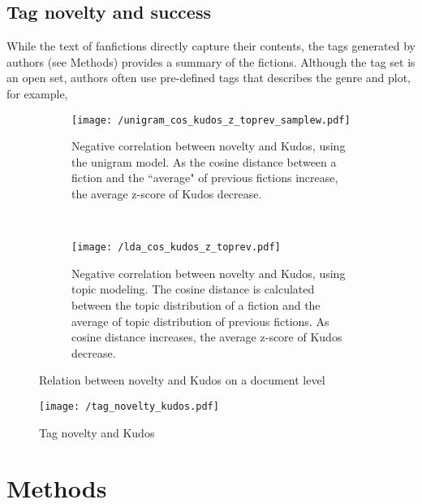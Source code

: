\documentclass[a4paper]{article}
\begin{document}
\subsection{Tag novelty and success}
While the text of fanfictions directly capture their contents, the tags generated by authors (see Methods) provides a summary of the fictions. Although the tag set is an open set, authors often use pre-defined tags that describes the genre and plot, for example, 





\begin{figure}
    \centering
    \begin{subfigure}[b]{0.4\textwidth}
        \texttt{[image: /unigram\_cos\_kudos\_z\_toprev\_samplew.pdf]}
        \caption{Negative correlation between novelty and Kudos, using the unigram model. As the cosine distance between a fiction and the ``average" of previous fictions increase, the average z-score of Kudos decrease.}
        \label{fig:unigram_cos}
    \end{subfigure}
    ~ %
    \begin{subfigure}[b]{0.4\textwidth}
        \texttt{[image: /lda\_cos\_kudos\_z\_toprev.pdf]}
        \caption{Negative correlation between novelty and Kudos, using topic modeling. The cosine distance is calculated between the topic distribution of a fiction and the average of topic distribution of previous fictions. As cosine distance increases, the average z-score of Kudos decrease.}
        \label{fig:lda_cos}
    \end{subfigure}
    \caption{Relation between novelty and Kudos on a document level}\label{fig:novelty_kudos_doc}
\end{figure}

\begin{figure}[htbp]
\begin{center}
\texttt{[image: /tag\_novelty\_kudos.pdf]}
\caption{Tag novelty and Kudos}
\label{fig:tag_novelty}
\end{center}
\end{figure}

\section{Methods} %
\label{sec:methods}
\end{document}
